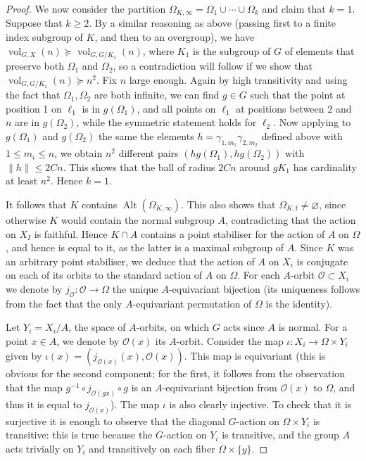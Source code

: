 \documentclass[11pt]{amsart}
\newcommand{\alt}{\ensuremath{\operatorname{Alt}}}%
\newcommand{\vol}{\ensuremath{\operatorname{vol}}}%
\theoremstyle{definition}
\theoremstyle{plain}
\theoremstyle{remark}
\begin{document}
\begin{proof}
We now consider the partition $\Omega_{K, \infty}=\Omega_1\cup \cdots \cup\Omega_k$ and claim that $k=1$.  Suppose that $k\ge 2$. By a similar reasoning as above (passing first to a finite index subgroup of $K$, and then to an overgroup), we have $\vol_{G, X}(n)\succcurlyeq \vol_{G, G/K_1}(n)$, where $K_1$ is the subgroup of $G$ of elements that preserve both $\Omega_1$ and $\Omega_2$, so a contradiction will follow if we show that $\vol_{G, G/K_1}(n)\succcurlyeq n^2$. Fix $n$ large enough. Again by high transitivity  and using the fact that $\Omega_1, \Omega_2$ are both infinite, we can find $g\in G$ such that the point at position 1 on $\ell_1$ is in $g(\Omega_1)$, and all points on $\ell_1$ at positions between 2 and $n$ are in $g(\Omega_2)$, while the symmetric statement holds for $\ell_2$. Now applying to $g(\Omega_1)$ and $g(\Omega_2)$ the same the elements $h=\gamma_{1, m_1}\gamma_{2, m_2}$ defined above with $1\le m_i\le n$, we obtain $n^2$ different pairs $(hg(\Omega_1), hg(\Omega_2))$ with $\lVert h\lVert \le 2Cn$. This shows that the ball of radius $2Cn$ around $gK_1$ has cardinality at least $n^2$. Hence $k=1$. 

It follows that $K$ contains $\alt(\Omega_{K, \infty})$. This also shows that $\Omega_{K, \mathrm{f}}\neq \varnothing$, since otherwise $K$ would contain the normal subgroup $A$, contradicting that the action on $X_I$ is faithful. Hence $K\cap A$ contains a point stabiliser for the action of $A$ on $\Omega$, and hence is equal to it, as the latter is a maximal subgroup of $A$. Since $K$ was an arbitrary point stabiliser, we deduce that the action of $A$ on $X_i$ is conjugate on each of its orbits to the standard action of $A$ on $\Omega$. For each $A$-orbit $\mathcal{O}\subset X_i$ we denote by $j_\mathcal{O}\colon \mathcal{O}\to \Omega$ the unique $A$-equivariant bijection (its uniqueness follows from the fact that the only $A$-equivariant permutation of $\Omega$ is the identity). 

Let $Y_i=X_i/A$, the space of $A$-orbits, on which $G$ acts since $A$ is normal. For a point $x\in A$, we denote by $\mathcal{O}(x)$ its $A$-orbit. Consider the map $\iota\colon X_i \to \Omega \times Y_i$ given by $\iota(x)=(j_{\mathcal{O}(x)}(x), \mathcal{O}(x))$. This map is equivariant (this is obvious for the second component; for the first, it follows from the observation that the map $g^{-1}\circ j_{\mathcal{O}(gx)} \circ g$ is an $A$-equivariant bijection from $\mathcal{O}(x)$ to $\Omega$, and thus it is equal to $j_{\mathcal{O}(x)}$). The map $\iota$ is also clearly injective. To check that it is surjective it is enough to observe that the diagonal $G$-action on $\Omega \times Y_i$ is transitive: this is true because the $G$-action on $Y_i$ is transitive, and the group $A$ acts trivially on $Y_i$ and transitively on each fiber $\Omega\times \{y\}$.


\end{proof}
\end{document}
